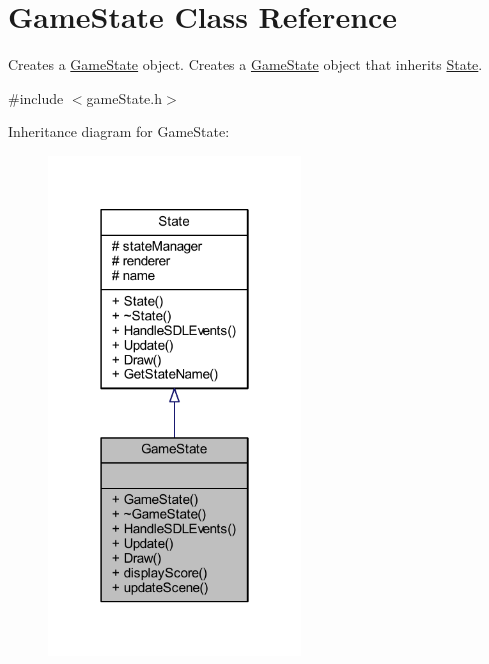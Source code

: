 \hypertarget{class_game_state}{\section{Game\+State Class Reference}
\label{class_game_state}
}


Creates a \hyperlink{class_game_state}{Game\+State} object. Creates a \hyperlink{class_game_state}{Game\+State} object that inherits \hyperlink{class_state}{State}.  




{\ttfamily \#include $<$game\+State.\+h$>$}



Inheritance diagram for Game\+State\+:
\nopagebreak
\begin{figure}[H]
\begin{center}
\leavevmode
\includegraphics[width=190pt]{class_game_state__inherit__graph}
\end{center}
\end{figure}



